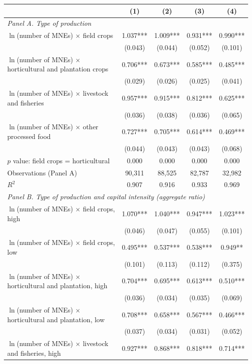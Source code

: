 \begin{tabular}{l*{4}{c}}
\toprule
 & (1) & (2) & (3) & (4) \\
\midrule
\multicolumn{5}{l}{\textit{Panel A. Type of production}} \\
$\ln$(number of MNEs) $\times$ field crops & 1.037*** & 1.009*** & 0.931*** & 0.990*** \\
 & (0.043) & (0.044) & (0.052) & (0.101) \\
$\ln$(number of MNEs) $\times$ horticultural and plantation crops & 0.706*** & 0.673*** & 0.585*** & 0.485*** \\
 & (0.029) & (0.026) & (0.025) & (0.041) \\
$\ln$(number of MNEs) $\times$ livestock and fisheries & 0.957*** & 0.915*** & 0.812*** & 0.625*** \\
 & (0.036) & (0.038) & (0.036) & (0.065) \\
$\ln$(number of MNEs) $\times$ other processed food & 0.727*** & 0.705*** & 0.614*** & 0.469*** \\
 & (0.044) & (0.043) & (0.043) & (0.068) \\
$p$ value: field crops = horticultural & 0.000 & 0.000 & 0.000 & 0.000 \\
Observations (Panel A) & 90,311 & 88,525 & 82,787 & 32,982 \\
$R^2$ & 0.907 & 0.916 & 0.933 & 0.969 \\
\midrule
\multicolumn{5}{l}{\textit{Panel B. Type of production and capital intensity (aggregate ratio)}} \\
$\ln$(number of MNEs) $\times$ field crops, high & 1.070*** & 1.040*** & 0.947*** & 1.023*** \\
 & (0.046) & (0.047) & (0.055) & (0.101) \\
$\ln$(number of MNEs) $\times$ field crops, low & 0.495*** & 0.537*** & 0.538*** & 0.949** \\
 & (0.101) & (0.113) & (0.112) & (0.375) \\
$\ln$(number of MNEs) $\times$ horticultural and plantation, high & 0.704*** & 0.695*** & 0.613*** & 0.510*** \\
 & (0.036) & (0.034) & (0.035) & (0.069) \\
$\ln$(number of MNEs) $\times$ horticultural and plantation, low & 0.708*** & 0.658*** & 0.567*** & 0.466*** \\
 & (0.037) & (0.034) & (0.031) & (0.052) \\
$\ln$(number of MNEs) $\times$ livestock and fisheries, high & 0.927*** & 0.868*** & 0.818*** & 0.714*** \\

\end{tabular}
